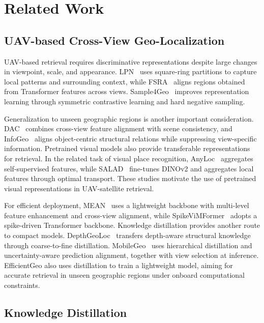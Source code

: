 \section{Related Work}
\label{sec:related_work}

\subsection{UAV-based Cross-View Geo-Localization}

UAV-based retrieval requires discriminative representations despite large changes in viewpoint, scale, and appearance. LPN~\cite{wang2022lpn} uses square-ring partitions to capture local patterns and surrounding context, while FSRA~\cite{dai2022fsra} aligns regions obtained from Transformer features across views. Sample4Geo~\cite{deuser2023sample4geo} improves representation learning through symmetric contrastive learning and hard negative sampling.

Generalization to unseen geographic regions is another important consideration. DAC~\cite{xia2024dac} combines cross-view feature alignment with scene consistency, and InfoGeo~\cite{zhang2026infogeo} aligns object-centric structural relations while suppressing view-specific information. Pretrained visual models also provide transferable representations for retrieval. In the related task of visual place recognition, AnyLoc~\cite{keetha2023anyloc} aggregates self-supervised features, while SALAD~\cite{izquierdo2024salad} fine-tunes DINOv2 and aggregates local features through optimal transport. These studies motivate the use of pretrained visual representations in UAV-satellite retrieval.

For efficient deployment, MEAN~\cite{chen2025mean} uses a lightweight backbone with multi-level feature enhancement and cross-view alignment, while SpikeViMFormer~\cite{chen2026spikevimformer} adopts a spike-driven Transformer backbone. Knowledge distillation provides another route to compact models. DepthGeoLoc~\cite{sun2026depthgeoloc} transfers depth-aware structural knowledge through coarse-to-fine distillation. MobileGeo~\cite{sun2025mobilegeo} uses hierarchical distillation and uncertainty-aware prediction alignment, together with view selection at inference. EfficientGeo also uses distillation to train a lightweight model, aiming for accurate retrieval in unseen geographic regions under onboard computational constraints.

\subsection{Knowledge Distillation}

